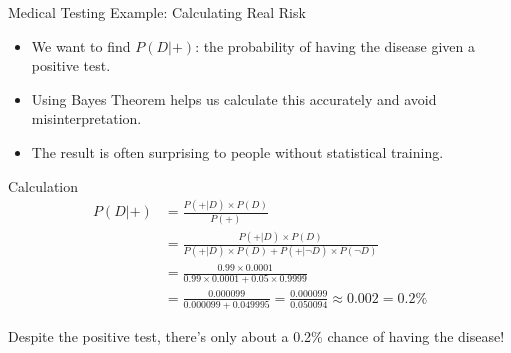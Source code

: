 \documentclass{beamer}
\begin{document}
	\begin{frame}{Medical Testing Example: Calculating Real Risk}
		\begin{itemize}
			\item We want to find $P(D|+)$: the probability of having the disease given a positive test.
			\item Using Bayes Theorem helps us calculate this accurately and avoid misinterpretation.
			\item The result is often surprising to people without statistical training.
		\end{itemize}
		
		\begin{exampleblock}{Calculation}
			\tiny
			\begin{align*}
				P(D|+) &= \frac{P(+|D) \times P(D)}{P(+)} \\[0.5em]
				&= \frac{P(+|D) \times P(D)}{P(+|D) \times P(D) + P(+|\neg D) \times P(\neg D)} \\[0.5em]
				&= \frac{0.99 \times 0.0001}{0.99 \times 0.0001 + 0.05 \times 0.9999} \\[0.5em]
				&= \frac{0.000099}{0.000099 + 0.049995}
				= \frac{0.000099}{0.050094}
				\approx 0.002 = 0.2\%
			\end{align*}
			
			Despite the positive test, there's only about a 0.2\% chance of having the disease!
		\end{exampleblock}
	\end{frame}
	
\end{document}
